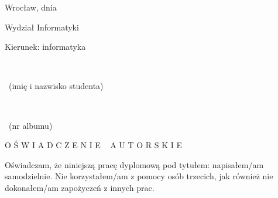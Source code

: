 \makeatletter

{}

\sffamily\bfseries

\newcommand{\oswiadczenieHeader}{%
  \begin{flushright}
    \textmd{Wrocław, dnia \@when}
  \end{flushright}

  \begin{flushleft}
    \changefont{14}
    
    \vspace*{20pt}
    Wydział Informatyki
    
    \bigskip
    \textmd{Kierunek:} informatyka

    \changefont{10}
    
    \vspace*{30pt}
    {\normalsize ~\@author}
    
    \vspace*{-4pt}
    \dotline{220pt}{r}
    
    \vspace*{-2pt}
    {\scriptsize ~\textmd{(imię i nazwisko studenta)}}
    
    \bigskip
    {\normalsize ~\@album}
    
    \vspace*{-4pt}
    \dotline{220pt}{r}
    
    \vspace*{-2pt}
    {\scriptsize ~\textmd{(nr albumu)}}
  \end{flushleft}
}




\cleardoublepage
{}
\thispagestyle{plain}

\oswiadczenieHeader

{}

\vspace*{80pt}
\begin{center}
    O Ś W I A D C Z E N I E ~ A U T O R S K I E
\end{center}

\vspace*{30pt}
\normalsize
\noindent\textmd{Oświadczam, że niniejszą pracę dyplomową pod tytułem: \@title\space
napisałem/am samodzielnie. Nie korzystałem/am z pomocy osób trzecich, jak również nie dokonałem/am zapożyczeń z innych prac.}

